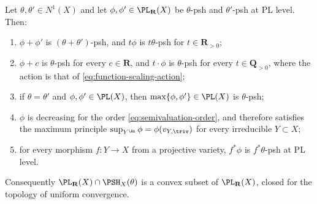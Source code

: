 \begin{proposition}
\label{prop:ch34-pl-operations}
Let $\theta,\theta'\in N^1(X)$ and let
$\phi,\phi'\in\PL_{\mathbf R}(X)$ be $\theta$-psh and $\theta'$-psh at
PL level.  Then:
\begin{enumerate}
\item\label{itm:ch34-plop:sum}
  $\phi+\phi'$ is $(\theta+\theta')$-psh, and $t\phi$ is
  $t\theta$-psh for $t\in\mathbf R_{>0}$;
\item\label{itm:ch34-plop:const}
  $\phi+c$ is $\theta$-psh for every $c\in\mathbf R$, and
  $t\cdot\phi$ is $\theta$-psh for every $t\in\mathbf Q_{>0}$, where
  the action is that of \eqref{eq:function-scaling-action};
\item\label{itm:ch34-plop:max}
  if $\theta=\theta'$ and $\phi,\phi'\in\PL(X)$, then
  $\max\{\phi,\phi'\}\in\PL(X)$ is $\theta$-psh;
\item\label{itm:ch34-plop:decreasing}
  $\phi$ is decreasing for the order \eqref{eq:semivaluation-order}, and
  therefore satisfies the maximum principle
  $\sup_{Y^{\An}}\phi=\phi(v_{Y,\triv})$ for every irreducible
  $Y\subset X$;
\item\label{itm:ch34-plop:pullback}
  for every morphism $f:Y\to X$ from a projective variety, $f^*\phi$ is
  $f^*\theta$-psh at PL level.
\end{enumerate}
Consequently $\PL_{\mathbf R}(X)\cap\PSH_X(\theta)$ is a convex subset of
$\PL_{\mathbf R}(X)$, closed for the topology of uniform convergence.
\end{proposition}

